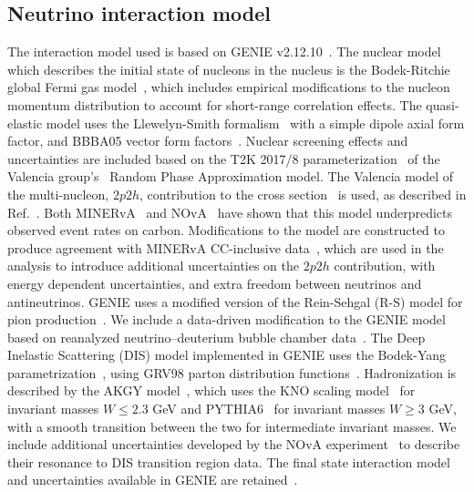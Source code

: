 \subsection{Neutrino interaction model}
The interaction model used is based on GENIE v2.12.10~\cite{Andreopoulos:2009rq,Andreopoulos:2015wxa}. The nuclear model which describes the initial state of nucleons in the nucleus is the Bodek-Ritchie global Fermi gas model~\cite{BodekRitchie}, which includes empirical modifications to the nucleon momentum distribution to account for short-range correlation effects. The quasi-elastic model uses the Llewelyn-Smith formalism~\cite{llewelyn-smith} with a simple dipole axial form factor, and BBBA05 vector form factors~\cite{bbba05}. Nuclear screening effects and uncertainties are included based on the T2K 2017/8 parameterization~\cite{Abe:2018wpn} of the Valencia group's~\cite{nieves1,nieves2} Random Phase Approximation model. The Valencia model of the multi-nucleon, $2p2h$, contribution to the cross section~\cite{nieves1,nieves2} is used, as described in Ref.~\cite{Schwehr:2016pvn}. Both MINERvA~\cite{Rodrigues:2015hik} and NOvA~\cite{NOvA:2018gge} have shown that this model underpredicts observed event rates on carbon. Modifications to the model are constructed to produce agreement with MINERvA CC-inclusive data~\cite{Rodrigues:2015hik}, which are used in the analysis to introduce additional uncertainties on the $2p2h$ contribution, with energy dependent uncertainties, and extra freedom between neutrinos and antineutrinos. GENIE uses a modified version of the Rein-Sehgal (R-S) model for pion production~\cite{Rein:1980wg}. We include a data-driven modification to the GENIE model based on reanalyzed neutrino--deuterium bubble chamber data~\cite{Wilkinson:2014yfa,Rodrigues:2016xjj}. The Deep Inelastic Scattering (DIS) model implemented in GENIE uses the Bodek-Yang parametrization~\cite{Bodek:2002ps}, using GRV98 parton distribution functions~\cite{Gluck:1998xa}. Hadronization is described by the AKGY model~\cite{Yang:2009zx}, which uses the KNO scaling model~\cite{Koba:1972ng} for invariant masses $W \leq 2.3$ GeV and PYTHIA6~\cite{Sjostrand:2006za} for invariant masses $W \geq 3$ GeV, with a smooth transition between the two for intermediate invariant masses. We include additional uncertainties developed by the NOvA experiment~\cite{nova_2018} to describe their resonance to DIS transition region data. The final state interaction model and uncertainties available in GENIE are retained~\cite{Dytman:2011zz,Dytman:2015taa,intranuke_2009}.


